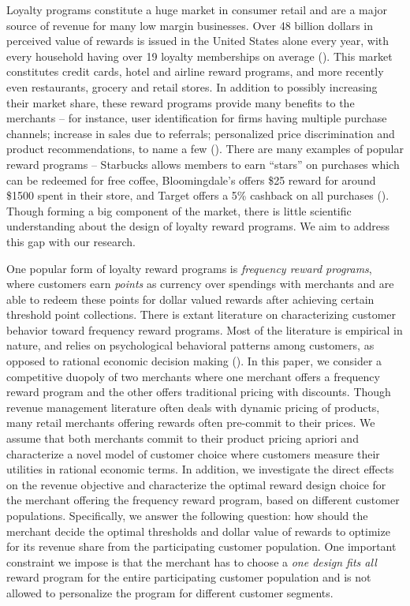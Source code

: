 Loyalty programs constitute a huge market in consumer retail and are a major source of revenue for many low margin businesses.
Over 48 billion dollars in perceived value of rewards is issued in the United States alone every year, with every household having over 19 loyalty memberships on average (\cite{berry2013loyalty}).
This market constitutes credit cards, hotel and airline reward programs, and more recently even restaurants, grocery and retail stores.
In addition to possibly increasing their market share, these reward programs provide many benefits to the merchants -- for instance, user identification for firms having multiple purchase channels; increase in sales due to referrals; personalized price discrimination and product recommendations, to name a few (\cite{ryu2007penny}).
There are many examples of popular reward programs -- Starbucks allows members to earn ``stars'' on purchases which can be redeemed for free coffee, Bloomingdale's offers \$25 reward for around \$1500 spent in their store, and Target offers a 5\% cashback on all purchases (\cite{cvs2015target}).
Though forming a big component of the market, there is little scientific understanding about the design of loyalty reward programs. We aim to address this gap with our research.

One popular form of loyalty reward programs is \emph{frequency reward programs}, where customers earn \emph{points} as currency over spendings with merchants and are able to redeem these points for dollar valued rewards after achieving certain threshold point collections.
There is extant literature on characterizing customer behavior toward frequency reward programs.
Most of the literature is empirical in nature, and relies on psychological behavioral patterns among customers, as opposed to rational economic decision making (\cite{kivetz2006goal,dreze2004using,gao2014influence}).
In this paper, we consider a competitive duopoly of two merchants where one merchant offers a frequency reward program and the other offers traditional pricing with discounts.
Though revenue management literature often deals with dynamic pricing of products, many retail merchants offering rewards often pre-commit to their prices. 
We assume that both merchants commit to their product pricing apriori and characterize a novel model of customer choice where customers measure their utilities in rational economic terms.
In addition, we investigate the direct effects on the revenue objective and characterize the optimal reward design choice for the merchant offering the frequency reward program, based on different customer populations.
Specifically, we answer the following question: how should the merchant decide the optimal thresholds and dollar value of rewards to optimize for its revenue share from the participating customer population.
One important constraint we impose is that the merchant has to choose a \emph{one design fits all} reward program for the entire participating customer population and is not allowed to personalize the program for different customer segments.

